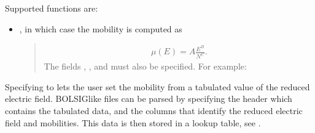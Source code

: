 \documentclass[letterpaper,10pt,english]{sphinxmanual}
\begin{document}
\sphinxAtStartPar
Supported functions are:
\begin{itemize}
\item {} 
\sphinxAtStartPar
{}, in which case the mobility is computed as
\begin{quote}
\begin{equation*}
\begin{split}\mu(E) = A \frac{E^B}{N^C}.\end{split}
\end{equation*}
\sphinxAtStartPar
The fields , , and  must also be specified.
For example:

\begin{sphinxVerbatim}[commandchars=\\\{\},formatcom=\scriptsize]
  \PYG{p}{[}
            
      
         
        
        
        
        
  \PYG{p}{]}
\end{sphinxVerbatim}
\end{quote}

\end{itemize}

\sphinxAtStartPar
{}

\sphinxAtStartPar
Specifying  to  lets the user set the mobility from a tabulated value of the reduced electric field.
BOLSIG\sphinxhyphen{}like files can be parsed by specifying the header which contains the tabulated data, and the columns that identify the reduced electric field and mobilities.
This data is then stored in a lookup table, see {\hyperref[\detokenize{Utilities/LookupTable:chap-lookuptable}]{}}.
\end{document}
